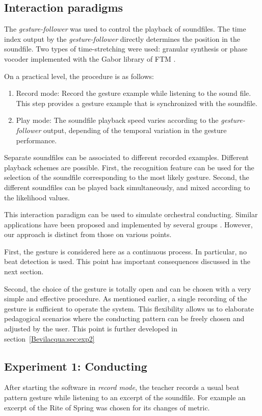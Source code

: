 \subsection{Interaction paradigms}
The \emph{gesture-follower} was used to control the playback of soundfiles. The time index output by the \emph{gesture-follower} directly determines the position in the soundfile. Two types of time-stretching were used: granular synthesis or phase vocoder implemented with the Gabor library of FTM \cite{Schnell:2005,Schnell:2005a}.

On a practical level, the procedure is as follows:
\begin{enumerate}


\item Record mode: Record the gesture example while listening to the sound file. This step provides a gesture example that is synchronized with the soundfile. 
\item Play mode: The soundfile playback speed varies according to the \emph{gesture-follower} output, depending of the temporal variation in the gesture performance. 
\end{enumerate}

Separate soundfiles can be associated to different recorded examples. Different playback schemes are possible. First, the recognition feature can be used for the selection of the soundfile corresponding to the most likely gesture. Second, the different soundfiles can be played back simultaneously, and mixed according to the likelihood values.

This interaction paradigm can be used to simulate orchestral conducting. Similar applications have been proposed and implemented by several groups  \cite{Borchers:2006,Lee:2006,Lee:2006a}. However, our approach is distinct from those on various points. 

First, the gesture is considered here as a continuous process. In particular, no beat detection is used. This point has important consequences discussed in the next section. 

Second, the choice of the gesture is totally open and can be chosen with a very simple and effective procedure. As mentioned earlier, a single recording of the gesture is sufficient to operate the system. This flexibility allows us to elaborate pedagogical scenarios where the conducting pattern can be freely chosen and adjusted by the user. This point is further developed in section~\ref{Bevilacqua:sec:exp2}

\subsection{Experiment 1: Conducting}
After starting the software in \emph{record mode}, the teacher records a usual beat pattern gesture while listening to an excerpt of the soundfile. For example an excerpt of the Rite of Spring was chosen for its changes of metric.


